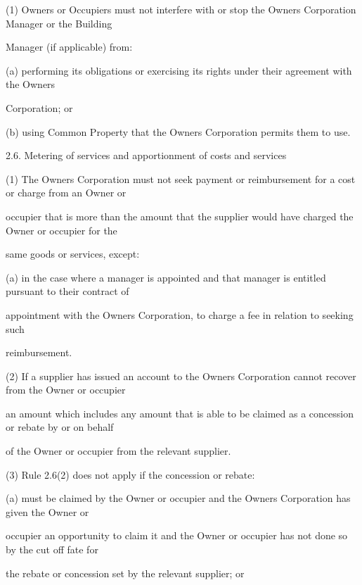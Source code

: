 \documentclass{article}
\begin{document}
{\fontsize{9.962}{1}(1) Owners or Occupiers must not interfere with or stop the Owners Corporation Manager or the Building }

{\fontsize{10.02}{1}Manager (if applicable) from: }

{\fontsize{9.962}{1}(a) performing its obligations or exercising its rights under their agreement with the Owners }

{\fontsize{10.02}{1}Corporation; or }

{\fontsize{9.962}{1}(b) using Common Property that the Owners Corporation permits them to use. }

{\fontsize{9.99}{1}2.6. Metering of services and apportionment of costs and services }

{\fontsize{9.962}{1}(1) The Owners Corporation must not seek payment or reimbursement for a cost or charge from an Owner or }

{\fontsize{10.02}{1}occupier that is more than the amount that the supplier would have charged the Owner or occupier for the }

{\fontsize{10.02}{1}same goods or services, except: }

{\fontsize{9.962}{1}(a) in the case where a manager is appointed and that manager is entitled pursuant to their contract of }

{\fontsize{10.02}{1}appointment with the Owners Corporation, to charge a fee in relation to seeking such }

{\fontsize{10.02}{1}reimbursement. }

{\fontsize{9.962}{1}(2) If a supplier has issued an account to the Owners Corporation cannot recover from the Owner or occupier }

{\fontsize{10.02}{1}an amount which includes any amount that is able to be claimed as a concession or rebate by or on behalf }

{\fontsize{10.02}{1}of the Owner or occupier from the relevant supplier. }

{\fontsize{9.962}{1}(3) Rule 2.6(2) does not apply if the concession or rebate: }

{\fontsize{9.962}{1}(a) must be claimed by the Owner or occupier and the Owners Corporation has given the Owner or }

{\fontsize{10.02}{1}occupier an opportunity to claim it and the Owner or occupier has not done so by the cut off fate for }

{\fontsize{10.02}{1}the rebate or concession set by the relevant supplier; or }
\end{document}
